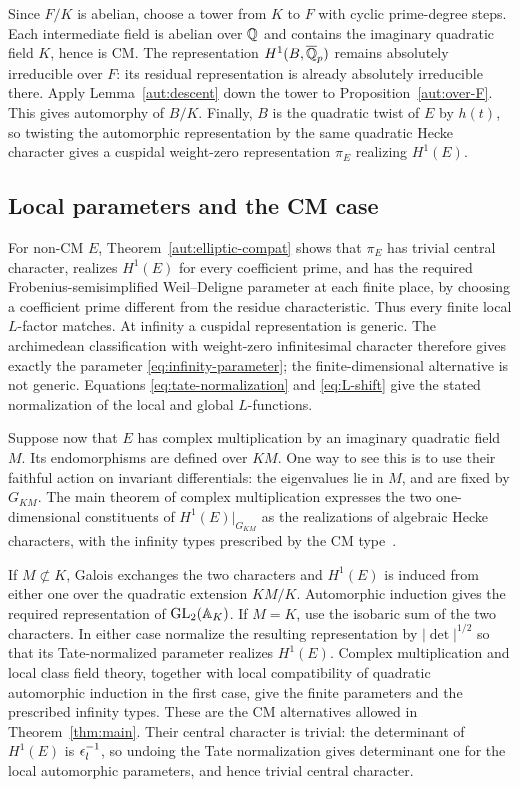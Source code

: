 Since $F/K$ is abelian, choose a tower from $K$ to $F$ with cyclic
prime-degree steps. Each intermediate field is abelian over $\mathbb Q$ and
contains the imaginary quadratic field $K$, hence is CM. The
representation $H^1(B,\overline{\mathbb Q}_p)$ remains absolutely irreducible
over $F$: its residual representation is already absolutely irreducible
there. Apply Lemma~\ref{aut:descent} down the tower to
Proposition~\ref{aut:over-F}. This gives automorphy of $B/K$. Finally,
$B$ is the quadratic twist of $E$ by $h(t)$, so twisting the automorphic
representation by the same quadratic Hecke character gives a cuspidal
weight-zero representation $\pi_E$ realizing $H^1(E)$.

\subsection{Local parameters and the CM case}

For non-CM $E$, Theorem~\ref{aut:elliptic-compat} shows that $\pi_E$
has trivial central character, realizes $H^1(E)$ for every coefficient
prime, and has the required Frobenius-semisimplified Weil--Deligne
parameter at each finite place, by choosing a coefficient prime different
from the residue characteristic. Thus every finite local $L$-factor
matches. At infinity a cuspidal representation is generic. The
archimedean classification with weight-zero infinitesimal character
therefore gives exactly the parameter \eqref{eq:infinity-parameter};
the finite-dimensional alternative is not generic. Equations
\eqref{eq:tate-normalization} and \eqref{eq:L-shift} give the stated
normalization of the local and global $L$-functions.

Suppose now that $E$ has complex multiplication by an imaginary quadratic
field $M$. Its endomorphisms are defined over $KM$. One way to see this
is to use their faithful action on invariant differentials: the
eigenvalues lie in $M$, and are fixed by $G_{KM}$. The main theorem of
complex multiplication expresses the two one-dimensional constituents
of $H^1(E)|_{G_{KM}}$ as the realizations of algebraic Hecke
characters, with the infinity types prescribed by the CM
type~\cite{ShimuraCM}.

If $M\not\subset K$, Galois exchanges the two characters and $H^1(E)$
is induced from either one over the quadratic extension $KM/K$.
Automorphic induction gives the required representation of
$\operatorname{GL}_2(\mathbb A_K)$. If $M=K$, use the isobaric sum of the two characters.
In either case normalize the resulting representation by
$|\det|^{1/2}$ so that its Tate-normalized parameter realizes $H^1(E)$.
Complex multiplication and local class field theory, together with local
compatibility of quadratic automorphic induction in the first case,
give the finite parameters and the prescribed infinity types. These are
the CM alternatives allowed in Theorem~\ref{thm:main}. Their central
character is trivial: the determinant of $H^1(E)$ is $\epsilon_l^{-1}$,
so undoing the Tate normalization gives determinant one for the local
automorphic parameters, and hence trivial central character.

